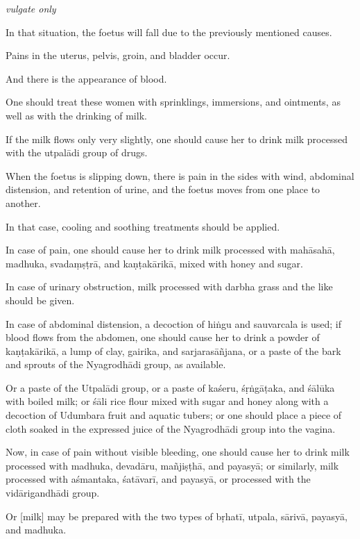 \begin{translation}
\begin{tt}
\item[56] \emph{vulgate only}

\item[57.1]

In that situation, the foetus will fall due to the previously mentioned
causes.

Pains in the uterus, pelvis, groin, and bladder occur.

And there is the appearance of blood.

One should treat these women with sprinklings, immersions, and
ointments, as well as with the drinking of milk.

If the milk flows only very slightly, one should cause her to drink milk
processed with the \gls{utpalādi} group of drugs.

When the foetus is slipping down, there is pain in the sides with wind,
abdominal distension, and retention of urine, and the foetus moves from
one place to another.

In that case, cooling and soothing treatments should be applied.

In case of pain, one should cause her to drink milk processed with
\gls{mahāsahā}, \gls{madhuka}, \gls{svadaṃṣṭrā}, and \gls{kaṇṭakārikā}, mixed with honey and
sugar.

In case of urinary obstruction, milk processed with \gls{darbha} grass and the
like should be given.

In case of abdominal distension, a decoction of \gls{hiṅgu} and \gls{sauvarcala} is
used; if blood flows from the abdomen, one should cause her to drink a
powder of \gls{kaṇṭakārikā}, a lump of clay, \gls{gairika}, and \gls{sarjarasāñjana}, or a
paste of the bark and sprouts of the Nyagrodhādi group, as available.

Or a paste of the Utpalādi group, or a paste of \gls{kaśeru}, \gls{śṛṅgāṭaka}, and
\gls{śālūka} with boiled milk; or \gls{śāli} rice flour mixed with sugar and honey
along with a decoction of Udumbara fruit and aquatic tubers; or one
should place a piece of cloth soaked in the expressed juice of the
Nyagrodhādi group into the vagina.

Now, in case of pain without visible bleeding, one should cause her to
drink milk processed with \gls{madhuka}, \gls{devadāru}, \gls{mañjiṣṭhā}, and \gls{payasyā}; or
similarly, milk processed with \gls{aśmantaka}, \gls{śatāvarī}, and \gls{payasyā}, or
processed with the \gls{vidārigandhādi} group.

Or [milk] may be prepared with the two types of \gls{bṛhatī}, \gls{utpala},
\gls{sārivā}, \gls{payasyā}, and \gls{madhuka}.


\end{tt}
\end{translation}
